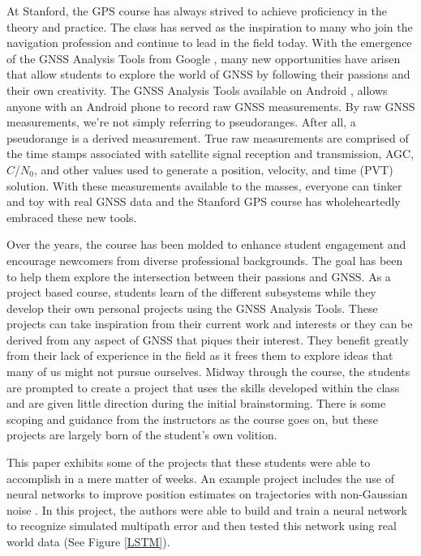 \documentclass[12pt, conference, onecolumn, draftclsnofoot]{IEEEtran}
\begin{document}
At Stanford, the GPS course has always strived to achieve proficiency in the theory and practice.
The class has served as the inspiration to many who join the navigation profession and continue to lead in the field today.
With the emergence of the GNSS Analysis Tools from Google \cite{vanDiggelen2018}, many new opportunities have arisen that allow students to explore the world of GNSS by following their passions and their own creativity.
The GNSS Analysis Tools available on Android \cite{GNSSAnalysisTools}, allows anyone with an Android phone to record raw GNSS measurements.
By raw GNSS measurements, we're not simply referring to pseudoranges.
After all, a pseudorange is a derived measurement.
True raw measurements are comprised of the time stamps associated with satellite signal reception and transmission, AGC, $C$/$N_0$, and other values used to generate a position, velocity, and time (PVT) solution.
With these measurements available to the masses, everyone can tinker and toy with real GNSS data and the Stanford GPS course has wholeheartedly embraced these new tools.

Over the years, the course has been molded to enhance student engagement and encourage newcomers from diverse professional backgrounds. 
The goal has been to help them explore the intersection between their passions and GNSS.
As a project based course, students learn of the different subsystems while they develop their own personal projects using the GNSS Analysis Tools.
These projects can take inspiration from their current work and interests or they can be derived from any aspect of GNSS that piques their interest.
They benefit greatly from their lack of experience in the field as it frees them to explore ideas that many of us might not pursue ourselves.
Midway through the course, the students are prompted to create a project that uses the skills developed within the class and are given little direction during the initial brainstorming.
There is some scoping and guidance from the instructors as the course goes on, but these projects are largely born of the student's own volition.

This paper exhibits some of the projects that these students were able to accomplish in a mere matter of weeks.
An example project includes the use of neural networks to improve position estimates on trajectories with non-Gaussian noise \cite{LSTM2018}.
In this project, the authors were able to build and train a neural network to recognize simulated multipath error and then tested this network using real world data (See Figure \ref{LSTM}).
\end{document}
